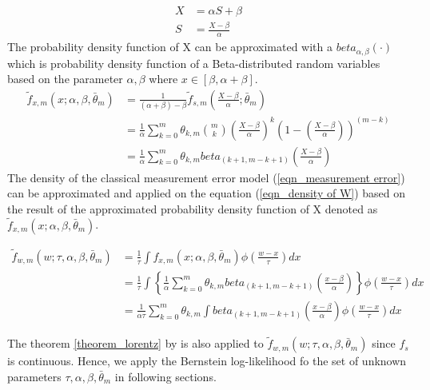 \begin{equation}
\begin{split}
X & = \alpha S+ \beta \\
S & = \frac{X-\beta}{\alpha}
\end{split}
\end{equation}
The probability density function of X can be approximated with a $beta_{\alpha, \beta}(\cdot)$  which is probability density function of a Beta-distributed random variables based on the parameter $\alpha, \beta$ where $x\in [\beta, \alpha+\beta]$.
\begin{equation}
\begin{split}
 \tilde f_{x,m}(x; \alpha, \beta, \bar{\theta}_m) &= \frac{1}{(\alpha+\beta)-\beta} \displaystyle \tilde f_{s,m}\left(\frac{X-\beta}{\alpha}; \bar \theta_m\right)\\
 &= \frac{1}{\alpha} \displaystyle \sum_{k=0}^m \theta_{k,m}\binom{m}{k} \left(\frac{X-\beta}{\alpha}\right)^k\left(1-\left(\frac{X-\beta}{\alpha}\right)\right)^{(m-k)}\\
 &= \frac{1}{\alpha} \displaystyle \sum_{k=0}^m \theta_{k,m} beta _{(k+1, m-k+1)}\left(\frac{X-\beta}{\alpha}\right)
\end{split}
\end{equation}
The density of the classical measurement error model (\ref{eqn_measurement error}) can be approximated and applied on the equation (\ref{eqn_density of W}) based on the result of the approximated probability density function of X denoted as $\tilde f_{x,m}(x; \alpha, \beta, \bar{\theta}_m)$.

\begin{equation} \label{eqn_approximation of W}
\begin{split}
\tilde f_{w,m}(w; \tau, \alpha, \beta, \bar \theta_m) & = \frac{1}{\tau}\int f_{x,m}(x; \alpha, \beta, \bar \theta_m) \phi \displaystyle\left(\frac{w-x}{\tau}\right) dx \\
 			& = \frac{1}{\tau}\displaystyle \int \left \{\frac{1}{\alpha} \sum_{k=0}^m \theta_{k,m} beta _{(k+1, m-k+1)}\left(\frac{x-\beta}{\alpha}\right)\right\}\phi \displaystyle\left(\frac{w-x}{\tau}\right) dx\\
            &= \frac{1}{\alpha\tau} \displaystyle \sum_{k=0}^m \theta_{k,m} \int beta _{(k+1, m-k+1)}\left(\frac{x-\beta}{\alpha}\right)\phi \displaystyle\left(\frac{w-x}{\tau}\right) dx
\end{split}
\end{equation}

The theorem \ref{theorem_lorentz} by \cite{lorentz2013bernstein} is also applied to $\tilde f_{w,m}(w; \tau, \alpha, \beta, \bar \theta_m)$  since $f_s$ is continuous. Hence, we apply the Bernstein log-likelihood fo the set of unknown parameters $ \tau, \alpha, \beta, \bar \theta_m$ in following sections.



